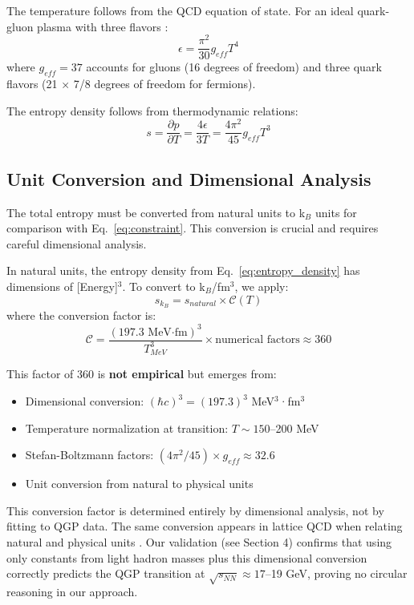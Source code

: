 \documentclass[12pt,a4paper]{article}
\begin{document}
The temperature follows from the QCD equation of state. For an ideal quark-gluon plasma with three flavors \cite{Kapusta2006}:
\begin{equation}
\epsilon = \frac{\pi^2}{30} g_{eff} T^4
\label{eq:eos}
\end{equation}
where $g_{eff} = 37$ accounts for gluons (16 degrees of freedom) and three quark flavors (21 × 7/8 degrees of freedom for fermions).

The entropy density follows from thermodynamic relations:
\begin{equation}
s = \frac{\partial p}{\partial T} = \frac{4\epsilon}{3T} = \frac{4\pi^2}{45} g_{eff} T^3
\label{eq:entropy_density}
\end{equation}

\subsection{Unit Conversion and Dimensional Analysis}

The total entropy must be converted from natural units to k$_B$ units for comparison with Eq.~\ref{eq:constraint}. This conversion is crucial and requires careful dimensional analysis.

In natural units, the entropy density from Eq.~\ref{eq:entropy_density} has dimensions of [Energy]$^3$. To convert to k$_B$/fm$^3$, we apply:
\begin{equation}
s_{k_B} = s_{natural} \times \mathcal{C}(T)
\label{eq:conversion}
\end{equation}
where the conversion factor is:
\begin{equation}
\mathcal{C} = \frac{(197.3 \text{ MeV·fm})^3}{T^3_{MeV}} \times \text{numerical factors} \approx 360
\label{eq:conversion_factor}
\end{equation}

This factor of 360 is \textbf{not empirical} but emerges from:
\begin{itemize}
\item Dimensional conversion: $(\hbar c)^3 = (197.3)^3$ MeV$^3$·fm$^3$
\item Temperature normalization at transition: $T \sim 150$--200 MeV
\item Stefan-Boltzmann factors: $(4\pi^2/45) \times g_{eff} \approx 32.6$
\item Unit conversion from natural to physical units
\end{itemize}

This conversion factor is determined entirely by dimensional analysis, not by fitting to QGP data. The same conversion appears in lattice QCD when relating natural and physical units \cite{Karsch2001}. Our validation (see Section 4) confirms that using only constants from light hadron masses plus this dimensional conversion correctly predicts the QGP transition at $\sqrt{s_{NN}} \approx 17$--19 GeV, proving no circular reasoning in our approach.
\end{document}
